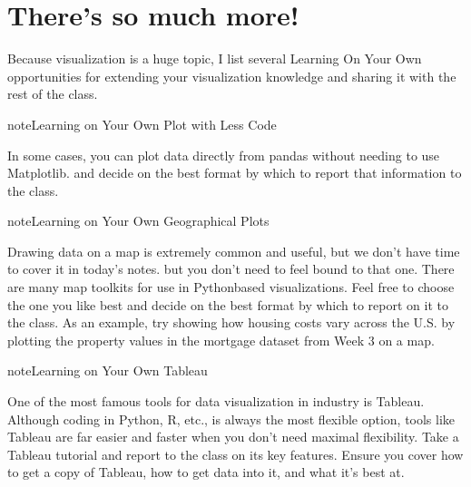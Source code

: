 \documentclass[letterpaper,10pt,english]{sphinxmanual}
\begin{document}
\noindent{}


\section{There’s so much more!}
\label{\detokenize{chapter-10-visualization:there-s-so-much-more}}
Because visualization is a huge topic, I list several Learning On Your Own opportunities for extending your visualization knowledge and sharing it with the rest of the class.

\begin{sphinxadmonition}{note}{Learning on Your Own \sphinxhyphen{} Plot with Less Code}

In some cases, you can plot data directly from pandas without needing to use Matplotlib.   and decide on the best format by which to report that information to the class.
\end{sphinxadmonition}

\begin{sphinxadmonition}{note}{Learning on Your Own \sphinxhyphen{} Geographical Plots}

Drawing data on a map is extremely common and useful, but we don’t have time to cover it in today’s notes.   but you don’t need to feel bound to that one.  There are many map toolkits for use in Python\sphinxhyphen{}based visualizations.  Feel free to choose the one you like best and decide on the best format by which to report on it to the class.  As an example, try showing how housing costs vary across the U.S. by plotting the property values in the mortgage dataset from Week 3 on a map.
\end{sphinxadmonition}

\begin{sphinxadmonition}{note}{Learning on Your Own \sphinxhyphen{} Tableau}

One of the most famous tools for data visualization in industry is Tableau.  Although coding in Python, R, etc., is always the most flexible option, tools like Tableau are far easier and faster when you don’t need maximal flexibility.  Take a Tableau tutorial and report to the class on its key features.  Ensure you cover how to get a copy of Tableau, how to get data into it, and what it’s best at.
\end{sphinxadmonition}
\end{document}

